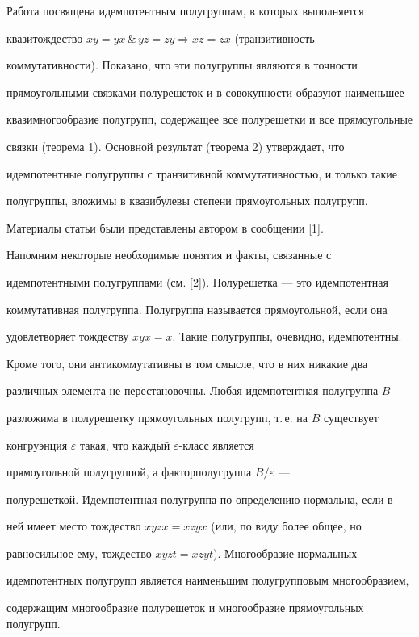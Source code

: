 Работа посвящена идемпотентным полугруппам, в которых выполняется


квазитождество $xy=yx\, \&\, yz=zy\Rightarrow xz=zx$ (транзитивность


коммутативности). Показано, что эти полугруппы являются в точности


прямоугольными связками полурешеток и в совокупности образуют наименьшее


квазимногообразие полугрупп, содержащее все полурешетки и все прямоугольные


связки (теорема 1).  Основной результат (теорема 2)  утверждает, что


идемпотентные полугруппы с транзитивной коммутативностью, и только такие


полугруппы,  вложимы в квазибулевы степени прямоугольных полугрупп.


Материалы статьи были представлены автором в сообщении [1].





Напомним некоторые необходимые понятия и факты, связанные с


идемпотентными полугруппами (см. [2]). Полурешетка --- это идемпотентная


коммутативная полугруппа. Полугруппа  называется  прямоугольной, если она


удовлетворяет тождеству $xyx=x$. Такие полугруппы, очевидно, идемпотентны.


Кроме того, они антикоммутативны в том смысле,  что в них никакие два


различных элемента не перестановочны. Любая идемпотентная полугруппа $B$


разложима в полурешетку прямоугольных полугрупп, т.\,е. на $B$ существует


конгруэнция $\varepsilon$ такая, что каждый $\varepsilon$-класс является


прямоугольной полугруппой, а факторполугруппа $B/\varepsilon$ ---


полурешеткой.  Идемпотентная полугруппа по определению нормальна, если в


ней имеет место тождество $xyzx=xzyx$ (или, по виду более общее, но


равносильное ему, тождество $xyzt=xzyt$). Многообразие нормальных


идемпотентных полугрупп является наименьшим полугрупповым многообразием,


содержащим многообразие полурешеток и многообразие прямоугольных полугрупп.





